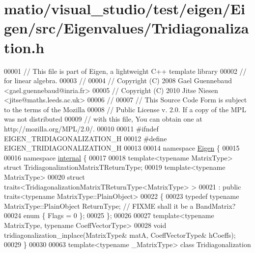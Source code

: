 \hypertarget{matio_2visual__studio_2test_2eigen_2_eigen_2src_2_eigenvalues_2_tridiagonalization_8h_source}{}\section{matio/visual\+\_\+studio/test/eigen/\+Eigen/src/\+Eigenvalues/\+Tridiagonalization.h}
\label{matio_2visual__studio_2test_2eigen_2_eigen_2src_2_eigenvalues_2_tridiagonalization_8h_source}

\begin{DoxyCode}
00001 \textcolor{comment}{// This file is part of Eigen, a lightweight C++ template library}
00002 \textcolor{comment}{// for linear algebra.}
00003 \textcolor{comment}{//}
00004 \textcolor{comment}{// Copyright (C) 2008 Gael Guennebaud <gael.guennebaud@inria.fr>}
00005 \textcolor{comment}{// Copyright (C) 2010 Jitse Niesen <jitse@maths.leeds.ac.uk>}
00006 \textcolor{comment}{//}
00007 \textcolor{comment}{// This Source Code Form is subject to the terms of the Mozilla}
00008 \textcolor{comment}{// Public License v. 2.0. If a copy of the MPL was not distributed}
00009 \textcolor{comment}{// with this file, You can obtain one at http://mozilla.org/MPL/2.0/.}
00010 
00011 \textcolor{preprocessor}{#ifndef EIGEN\_TRIDIAGONALIZATION\_H}
00012 \textcolor{preprocessor}{#define EIGEN\_TRIDIAGONALIZATION\_H}
00013 
00014 \textcolor{keyword}{namespace }\hyperlink{namespace_eigen}{Eigen} \{ 
00015 
00016 \textcolor{keyword}{namespace }\hyperlink{namespaceinternal}{internal} \{
00017   
00018 \textcolor{keyword}{template}<\textcolor{keyword}{typename} MatrixType> \textcolor{keyword}{struct }TridiagonalizationMatrixTReturnType;
00019 \textcolor{keyword}{template}<\textcolor{keyword}{typename} MatrixType>
00020 \textcolor{keyword}{struct }traits<TridiagonalizationMatrixTReturnType<MatrixType> >
00021   : \textcolor{keyword}{public} traits<typename MatrixType::PlainObject>
00022 \{
00023   \textcolor{keyword}{typedef} \textcolor{keyword}{typename} MatrixType::PlainObject ReturnType; \textcolor{comment}{// FIXME shall it be a BandMatrix?}
00024   \textcolor{keyword}{enum} \{ Flags = 0 \};
00025 \};
00026 
00027 \textcolor{keyword}{template}<\textcolor{keyword}{typename} MatrixType, \textcolor{keyword}{typename} CoeffVectorType>
00028 \textcolor{keywordtype}{void} tridiagonalization\_inplace(MatrixType& matA, CoeffVectorType& hCoeffs);
00029 \}
00030 
00063 \textcolor{keyword}{template}<\textcolor{keyword}{typename} \_MatrixType> \textcolor{keyword}{class }Tridiagonalization

\end{DoxyCode}
